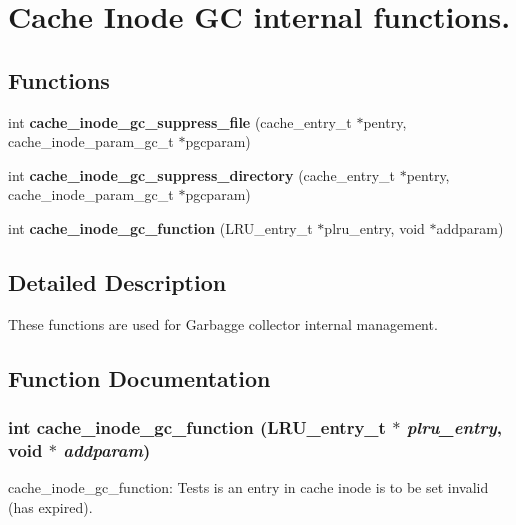 \section{Cache Inode GC internal functions.}
\label{group__Cache__inode__gc__internal}
\subsection*{Functions}
\begin{CompactItemize}
\item 
int {\bf cache\_\-inode\_\-gc\_\-suppress\_\-file} (cache\_\-entry\_\-t $\ast$pentry, cache\_\-inode\_\-param\_\-gc\_\-t $\ast$pgcparam)
\item 
int {\bf cache\_\-inode\_\-gc\_\-suppress\_\-directory} (cache\_\-entry\_\-t $\ast$pentry, cache\_\-inode\_\-param\_\-gc\_\-t $\ast$pgcparam)
\item 
int {\bf cache\_\-inode\_\-gc\_\-function} (LRU\_\-entry\_\-t $\ast$plru\_\-entry, void $\ast$addparam)
\end{CompactItemize}


\subsection{Detailed Description}
These functions are used for Garbagge collector internal management. 

\subsection{Function Documentation}
\subsubsection[{cache\_\-inode\_\-gc\_\-function}]{\setlength{\rightskip}{0pt plus 5cm}int cache\_\-inode\_\-gc\_\-function (LRU\_\-entry\_\-t $\ast$ {\em plru\_\-entry}, \/  void $\ast$ {\em addparam})}\label{group__Cache__inode__gc__internal_g1a749f9170eb28914650d29382b6ed81}


cache\_\-inode\_\-gc\_\-function: Tests is an entry in cache inode is to be set invalid (has expired).

